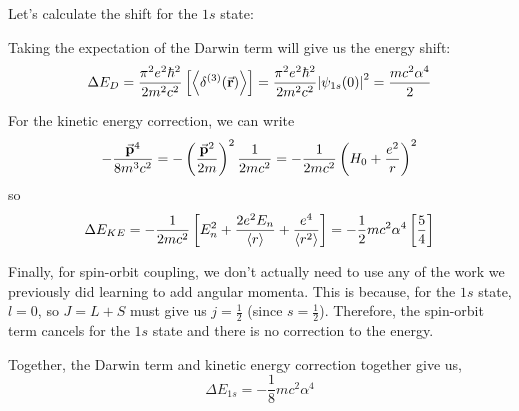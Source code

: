 \documentclass[a4paper,twoside,master.tex]{subfiles}
\begin{document}
Let's calculate the shift for the $ 1s $ state:

Taking the expectation of the Darwin term will give us the energy shift:
\begin{equation}
    \Delta E_{D} = \frac{\pi^2 e^2 \hbar^2}{2m^2 c^2} \left[ \ev{\delta^{(3)}(\va{r})} \right] = \frac{\pi^2 e^2 \hbar^2}{2m^2 c^2} \abs{\psi_{1s}(0)}^2 = \frac{m c^2 \alpha^4}{2} 
\end{equation}

For the kinetic energy correction, we can write
\begin{equation}
    - \frac{\va{p}^4}{8m^3 c^2} = - \left( \frac{\va{p}^2}{2m} \right)^2 \frac{1}{2mc^2} = - \frac{1}{2mc^2} \left( H_0 + \frac{e^2}{r} \right)^2
\end{equation}
so
\begin{equation}
    \Delta E_{KE} = - \frac{1}{2m c^2} \left[ E_n^2 + \frac{2 e^2 E_n}{\ev{r}} + \frac{e^4}{\ev{r^2}} \right] = - \frac{1}{2} m c^2 \alpha^4 \left[ \frac{5}{4} \right]
\end{equation}

Finally, for spin-orbit coupling, we don't actually need to use any of the work we previously did learning to add angular momenta. This is because, for the $ 1s $ state, $ l = 0 $, so $ J = L + S $ must give us $ j = \frac{1}{2} $ (since $ s = \frac{1}{2} $). Therefore, the spin-orbit term cancels for the $ 1s $ state and there is no correction to the energy. 

Together, the Darwin term and kinetic energy correction together give us,
\begin{equation}
    \Delta E_{1s} = - \frac{1}{8} mc^2 \alpha^4
\end{equation}
\end{document}
